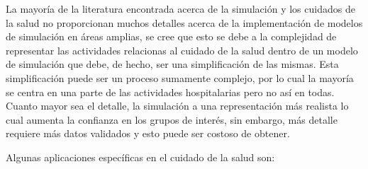 





	


La mayoría de la literatura encontrada acerca de la simulación y los cuidados de
la salud no proporcionan muchos detalles acerca de la implementación de modelos
de simulación en áreas amplias, se cree que esto se debe a la complejidad de
representar las actividades relacionas al cuidado de la salud dentro de un
modelo de simulación que debe, de hecho, ser una simplificación de las mismas.
Esta simplificación puede ser un proceso sumamente complejo, por lo cual la
mayoría se centra en una parte de las actividades hospitalarias pero no así en
todas. Cuanto mayor sea el detalle, la simulación  a una representación
más realista lo cual aumenta la confianza en los grupos de interés, sin embargo,
más detalle requiere más datos validados y esto puede ser costoso de
obtener\cite{guna:simulation}.

Algunas aplicaciones específicas en el cuidado de la salud son:

